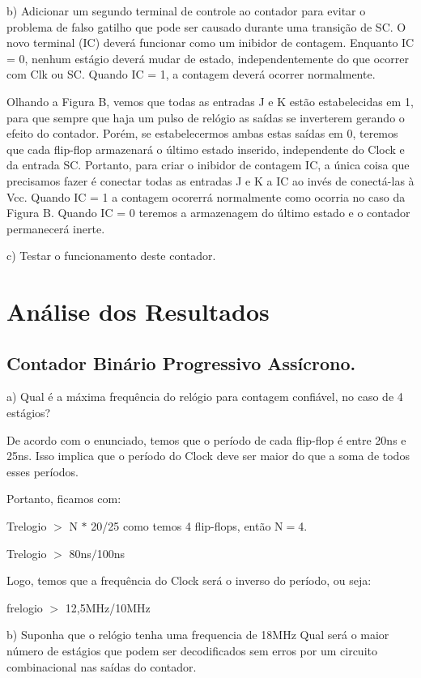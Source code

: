 \documentclass[12pt]{article}
\begin{document}
	b) Adicionar um segundo terminal de controle ao contador para evitar o problema de falso gatilho que pode ser causado durante uma transição de SC. O novo terminal (IC) deverá funcionar como um inibidor de contagem. Enquanto IC = 0, nenhum estágio deverá mudar de estado, independentemente do que ocorrer com Clk ou SC. Quando IC = 1, a contagem deverá ocorrer normalmente.
	
	
	Olhando a Figura B, vemos que todas as entradas J e K estão estabelecidas em 1, para que sempre que haja um pulso de relógio as saídas se inverterem gerando o efeito do contador. Porém, se estabelecermos ambas estas saídas em 0, teremos que cada flip-flop armazenará o último estado inserido, independente do Clock e da entrada SC. Portanto, para criar o inibidor de contagem IC, a única coisa que precisamos fazer é conectar todas as entradas J e K  a IC ao invés de conectá-las à Vcc. Quando IC = 1 a contagem ocorerrá normalmente como ocorria no caso da Figura B. Quando IC = 0 teremos a armazenagem do último estado e o contador permanecerá inerte.
	
	c)  Testar o funcionamento deste contador.   
	
	
	\section{Análise dos Resultados}
	\label{sec:Resultados}
	
	\subsection{Contador Binário Progressivo Assícrono.}
		\begin{flushleft}
			a) Qual é a máxima frequência do relógio para contagem confiável, no caso de 4 estágios?
		\end{flushleft}
		De acordo com o enunciado, temos que o período de cada flip-flop é entre 20ns e 25ns. Isso implica que o período do Clock deve ser maior do que a soma de todos esses períodos.
		
		Portanto, ficamos com:


		Trelogio $ > $ N $*$ 20/25 como temos 4 flip-flops, então N$=$4.

		Trelogio $>$ 80ns$/$100ns

		Logo, temos que a frequência do Clock será o inverso do período, ou seja:
	
		
		frelogio $>$ 12,5MHz/10MHz 
		
		
	\begin{flushleft}
		b)	Suponha que o relógio tenha uma frequencia de 18MHz Qual será o maior número de estágios que podem ser decodificados sem erros por um circuito combinacional nas saídas do contador.
	\end{flushleft}
\end{document}
